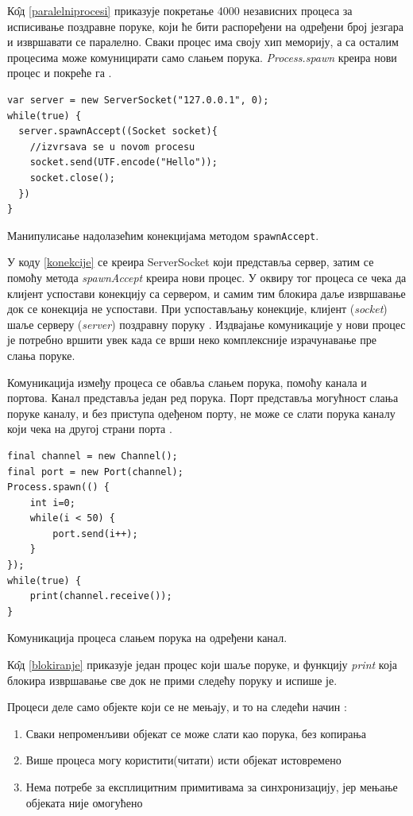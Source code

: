 \documentclass[12pt,oneside]{memoir}
\begin{document}
К\^{о}д \ref{paralelniprocesi} приказује покретање 4000 независних процеса за исписивање поздравне поруке, који ће бити распоређени на одређени број језгара и извршавати се паралелно. Сваки процес има своју хип меморију, а са осталим процесима може комуницирати само слањем порука. \textit{Process.spawn} креира нови процес и покреће га \cite{procesi_i_izolate}.

\begin{listing}
\begin{verbatim}
var server = new ServerSocket("127.0.0.1", 0);
while(true) {
  server.spawnAccept((Socket socket){
	//izvrsava se u novom procesu
	socket.send(UTF.encode("Hello"));
	socket.close();
  })
}
\end{verbatim}
\caption{Манипулисање надолазећим конекцијама методом \texttt{spawnAccept}.}
\label{konekcije}
\end{listing}

У коду \ref{konekcije} се креира ServerSocket који представља сервер, затим се помоћу метода \textit{spawnAccept} креира нови процес. У оквиру тог процеса се чека да клијент успостави конекцију са сервером, и самим тим блокира даље извршавање док се конекција не успостави. При успостављању конекције, клијент (\textit{socket}) шаље серверу (\textit{server}) поздравну поруку \cite{Dartino}. Издвајање комуникације у нови процес је потребно вршити увек када се врши неко комплексније израчунавање пре слања поруке.

Комуникација између процеса се обавља слањем порука, помоћу канала и портова. Канал представља један ред порука. Порт представља могућност слања поруке каналу, и без приступа одеђеном порту, не може се слати порука каналу који чека на другој страни порта \cite{Dartino}.

\begin{listing}
\begin{verbatim}
final channel = new Channel();
final port = new Port(channel);
Process.spawn(() {
	int i=0;
	while(i < 50) {
		port.send(i++);
	}
});
while(true) {
	print(channel.receive());
}
\end{verbatim}
\caption{Комуникација процеса слањем порука на одређени канал.}
\label{blokiranje}
\end{listing}

К\^{о}д \ref{blokiranje} приказује један процес који шаље поруке, и функцију \textit{print} која блокира извршавање све док не прими следећу поруку и испише је.

Процеси деле само објекте који се не мењају, и то на следећи начин \cite{Dartino}:
\begin{enumerate}
\item Сваки непроменљиви објекат се може слати као порука, без копирања
\item Више процеса могу користити(читати) исти објекат истовремено
\item Нема потребе за експлицитним примитивама за синхронизацију, јер мењање објеката није омогућено
\end{enumerate}
\end{document}
